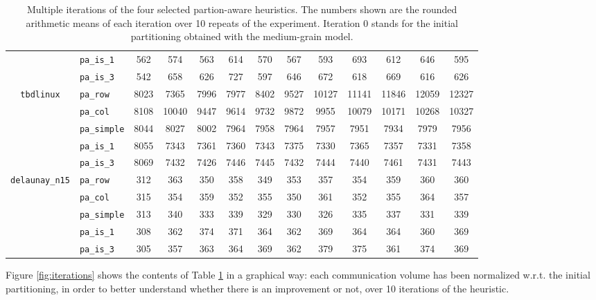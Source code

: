 \begin{table}
\begin{tabular}{|c|l|c||c|c|c|c|c|c|c|c|c|c|}
		&\verb|pa_is_1| & 562 & 574 & 563 & 614 & 570 & 567 & 593 & 693 & 612 & 646 & 595 \\
		&\verb|pa_is_3| &542 & 658 & 626 & 727 & 597 & 646 & 672 & 618 & 669 & 616 & 626 \\ \hline
		\multirow{5}{*}{\texttt{tbdlinux}}		&\verb|pa_row| & 8023 & 7365  & 7996  & 7977  & 8402  & 9527 & 10127 & 11141 & 11846 & 12059 & 12327 \\ 
		&\verb|pa_col| & 8108 & 10040  & 9447  & 9614  & 9732  & 9872  & 9955 & 10079 & 10171 & 10268 & 10327 \\ 
		&\verb|pa_simple| & 8044 & 8027 & 8002 & 7964 & 7958 & 7964 & 7957 & 7951 & 7934 & 7979 & 7956 \\
		&\verb|pa_is_1| & 8055 & 7343 & 7361 & 7360 & 7343 & 7375 & 7330 & 7365 & 7357 & 7331 & 7358 \\
		&\verb|pa_is_3| & 8069 & 7432 & 7426 & 7446 & 7445 & 7432 & 7444 & 7440 & 7461 & 7431 & 7443 \\ \hline
		\multirow{5}{*}{\texttt{delaunay\_n15}}		&\verb|pa_row| & 312 & 363 &  350 &  358 &  349 &  353 &  357 &  354  & 359 &  360 &  360 \\ 
		&\verb|pa_col| & 315 & 354 & 359 & 352 & 355 & 350 & 361 & 352 & 355 & 364 & 357 \\ 
		&\verb|pa_simple| & 313 & 340 & 333 & 339 & 329 & 330 & 326 & 335 & 337 & 331 & 339 \\
		&\verb|pa_is_1| & 308 & 362 & 374 & 371 & 364 & 362 & 369 & 364 & 364 & 360 & 369 \\
		&\verb|pa_is_3| & 305 & 357 & 363 & 364 & 369 & 362 & 379 & 375 & 361 & 374 & 369 \\\hline
		\end{tabular}
	\caption{Multiple iterations of the four selected partion-aware heuristics. The numbers shown are the rounded arithmetic means of each iteration over 10 repeats of the experiment. Iteration 0 stands for the initial partitioning obtained with the medium-grain model.} \label{tab:iterations}
\end{table}

Figure \ref{fig:iterations} shows the contents of Table \ref{tab:iterations} in a graphical way: each communication volume has been normalized w.r.t. the initial partitioning, in order to better understand whether there is an improvement or not, over 10 iterations of the heuristic.

